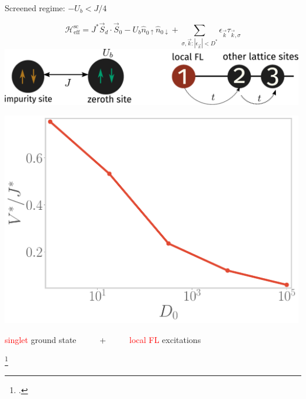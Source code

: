 \documentclass[11pt,aspectratio=169]{beamer}
\newcommand{\focus}[1]{\textcolor{red}{#1}}
\begin{document}
\begin{frame}{Screened regime: \(-U_b < J/4 \)}
\hspace*{-20pt}
\begin{minipage}{0.6\textwidth}
\[\mathcal{H}_\text{eff}^\text{sc} = J^* \vec{S}_d\cdot\vec{S}_0 - U_b \hat n_{0 \uparrow} \hat n_{0 \downarrow} + \sum_{\sigma,\vec k:|\epsilon_{\vec k}| < D^*} \epsilon_{\vec k} \tau_{\vec k,\sigma}\]
\includegraphics[width=0.99\textwidth]{figures/singlet.pdf}
\end{minipage}
\hspace*{10pt}
\begin{minipage}{0.39\textwidth}
	\includegraphics[width=0.99\textwidth]{figures/J_bandwidth.pdf}
\end{minipage}

\vspace*{\fill}

\focus{singlet} ground state ~ ~ ~ {\LARGE +} ~ ~ ~ \focus{local FL} excitations

\vspace*{\fill}

\footcite{wilson1975,nozieres1974fermi}
\end{frame}
\end{document}
